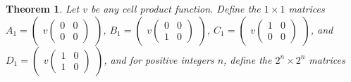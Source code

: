 \documentclass[12pt]{article}
\theoremstyle{plain}
\newtheorem{thm}{Theorem}[section]
\theoremstyle{remark}
\theoremstyle{definition}
\theoremstyle{remark}
\theoremstyle{definition}
\begin{document}
\begin{thm}
Let $v$ be any cell product function. Define the $1\times1$ matrices $A_{1}=\begin{pmatrix}v\left(\begin{smallmatrix}0 & 0\\ 0 & 0 \end{smallmatrix}\right)\end{pmatrix}$, $B_{1}=\begin{pmatrix}v\left(\begin{smallmatrix}0 & 0\\ 1 & 0 \end{smallmatrix}\right)\end{pmatrix}$, $C_{1}=\begin{pmatrix}v\left(\begin{smallmatrix}1 & 0\\ 0 & 0 \end{smallmatrix}\right)\end{pmatrix}$, and $D_{1}=\begin{pmatrix}v\left(\begin{smallmatrix}1 & 0\\ 1 & 0 \end{smallmatrix}\right)\end{pmatrix}$, and for positive integers $n$, define the $2^{n}\times2^{n}$ matrices


\end{thm}
\end{document}
